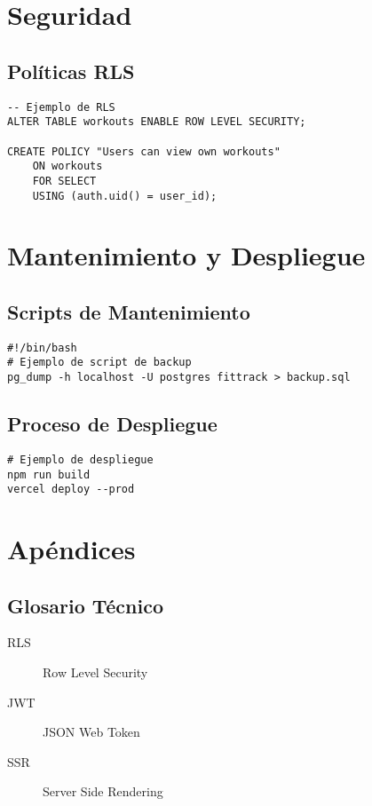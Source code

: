 \documentclass[12pt,a4paper]{report}
\begin{document}
\chapter{Seguridad}

\section{Políticas RLS}
\begin{verbatim}
-- Ejemplo de RLS
ALTER TABLE workouts ENABLE ROW LEVEL SECURITY;

CREATE POLICY "Users can view own workouts"
    ON workouts
    FOR SELECT
    USING (auth.uid() = user_id);
\end{verbatim}

\chapter{Mantenimiento y Despliegue}

\section{Scripts de Mantenimiento}
\begin{verbatim}
#!/bin/bash
# Ejemplo de script de backup
pg_dump -h localhost -U postgres fittrack > backup.sql
\end{verbatim}

\section{Proceso de Despliegue}
\begin{verbatim}
# Ejemplo de despliegue
npm run build
vercel deploy --prod
\end{verbatim}

\chapter{Apéndices}

\section{Glosario Técnico}
\begin{description}
    \item[RLS] Row Level Security
    \item[JWT] JSON Web Token
    \item[SSR] Server Side Rendering
\end{description}
\end{document}
